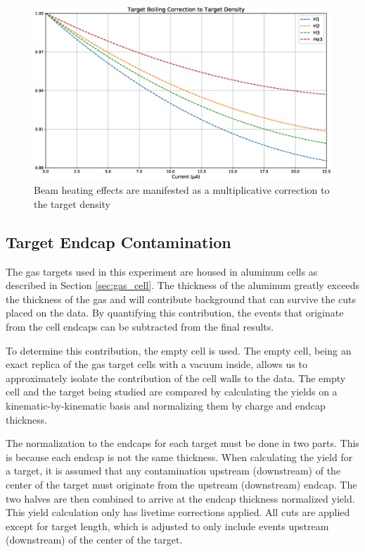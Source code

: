 \begin{figure}
	\includegraphics[width=\textwidth]{./analysis/fig/boil_cor.eps}
	\caption{Beam heating effects are manifested as a multiplicative correction to the target density}
	\label{fig:boilcor}
\end{figure}


\subsection{Target Endcap Contamination}
\label{sec:ecc}

The gas targets used in this experiment are housed in aluminum cells as described in Section \ref{sec:gas_cell}. The thickness of the aluminum greatly exceeds the thickness of the gas and will contribute background that can survive the cuts placed on the data. By quantifying this contribution, the events that originate from the cell endcaps can be subtracted from the final results.

To determine this contribution, the empty cell is used. The empty cell, being an exact replica of the gas target cells with a vacuum inside, allows us to approximately isolate the contribution of the cell walls to the data. The empty cell and the target being studied are compared by calculating the yields on a kinematic-by-kinematic basis and normalizing them by charge and endcap thickness.

The normalization to the endcaps for each target must be done in two parts. This is because each endcap is not the same thickness. When calculating the yield for a target, it is assumed that any contamination upstream (downstream) of the center of the target must originate from the upstream (downstream) endcap. The two halves are then combined to arrive at the endcap thickness normalized yield. This yield calculation only has livetime corrections applied. All cuts are applied except for target length, which is adjusted to only include events upstream (downstream) of the center of the target.

